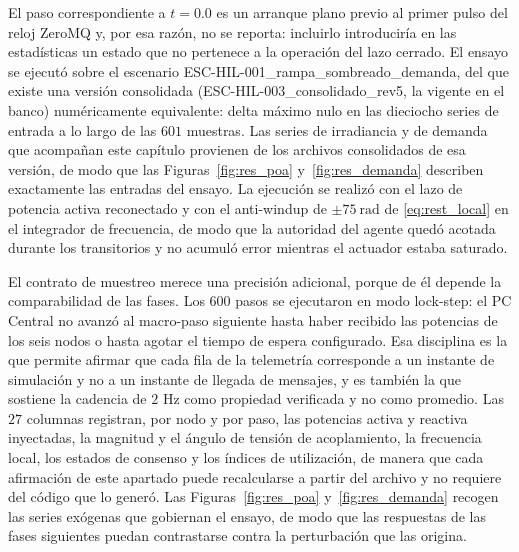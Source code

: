 El paso correspondiente a $t = 0.0$ es un arranque plano previo al primer pulso del reloj ZeroMQ y, por esa razón, no se reporta: incluirlo introduciría en las estadísticas un estado que no pertenece a la operación del lazo cerrado. El ensayo se ejecutó sobre el escenario ESC-HIL-001\_rampa\_sombreado\_demanda, del que existe una versión consolidada (ESC-HIL-003\_consolidado\_rev5, la vigente en el banco) numéricamente equivalente: delta máximo nulo en las dieciocho series de entrada a lo largo de las $601$ muestras. Las series de irradiancia y de demanda que acompañan este capítulo provienen de los archivos consolidados de esa versión, de modo que las Figuras~\ref{fig:res_poa} y~\ref{fig:res_demanda} describen exactamente las entradas del ensayo. La ejecución se realizó con el lazo de potencia activa reconectado y con el anti-windup de $\pm 75\ \text{rad}$ de \eqref{eq:rest_local} en el integrador de frecuencia, de modo que la autoridad del agente quedó acotada durante los transitorios y no acumuló error mientras el actuador estaba saturado.

El contrato de muestreo merece una precisión adicional, porque de él depende la comparabilidad de las fases. Los $600$ pasos se ejecutaron en modo lock-step: el PC Central no avanzó al macro-paso siguiente hasta haber recibido las potencias de los seis nodos o hasta agotar el tiempo de espera configurado. Esa disciplina es la que permite afirmar que cada fila de la telemetría corresponde a un instante de simulación y no a un instante de llegada de mensajes, y es también la que sostiene la cadencia de $2\text{ Hz}$ como propiedad verificada y no como promedio. Las $27$ columnas registran, por nodo y por paso, las potencias activa y reactiva inyectadas, la magnitud y el ángulo de tensión de acoplamiento, la frecuencia local, los estados de consenso y los índices de utilización, de manera que cada afirmación de este apartado puede recalcularse a partir del archivo y no requiere del código que lo generó. Las Figuras~\ref{fig:res_poa} y~\ref{fig:res_demanda} recogen las series exógenas que gobiernan el ensayo, de modo que las respuestas de las fases siguientes puedan contrastarse contra la perturbación que las origina.

